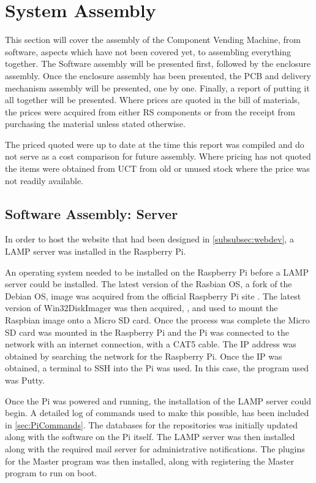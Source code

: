 \documentclass[a4paper,11pt]{article}
\numberwithin{figure}{section}
\numberwithin{table}{section}
\begin{document}
\newpage

\section{System Assembly}\thispagestyle{sectionstart}
This section will cover the assembly of the Component Vending Machine, from software, aspects which have not been covered yet, to assembling everything together. The Software assembly will be presented first, followed by the enclosure assembly. Once the enclosure assembly has been presented, the PCB and delivery mechanism assembly will be presented, one by one. Finally, a report of putting it all together will be presented. Where prices are quoted in the bill of materials, the prices were acquired from either RS components \cite{rsonline} or from the receipt from purchasing the material unless stated otherwise.

The priced quoted were up to date at the time this report was compiled and do not serve as a cost comparison for future assembly. Where pricing has not quoted the items were obtained from UCT from old or unused stock where the price was not readily available.

\subsection{Software Assembly: Server}

In order to host the website that had been designed in \autoref{subsubsec:webdev}, a LAMP server was installed in the Raspberry Pi.

An operating system needed to be installed on the Raspberry Pi before a LAMP server could be installed. The latest version of the Rasbian OS, a fork of the Debian OS, image was acquired from the official Raspberry Pi site \cite{raspbian}. The latest version of Win32DiskImager was then acquired, \cite{diskimage}, and used to mount the Raspbian image onto a Micro SD card. Once the process was complete the Micro SD card was mounted in the Raspberry Pi and the Pi was connected to the network with an internet connection, with a CAT5 cable. The IP address was obtained by searching the network for the Raspberry Pi. Once the IP was obtained, a terminal to SSH into the Pi was used. In this case, the program used was Putty.

Once the Pi was powered and running, the installation of the LAMP server could begin. A detailed log of commands used to make this possible, has been included in \autoref{sec:PiCommands}. The databases for the repositories was initially updated along with the software on the Pi itself. The LAMP server was then installed along with the required mail server for administrative notifications. The plugins for the Master program was then installed, along with registering the Master program to run on boot.
\end{document}
